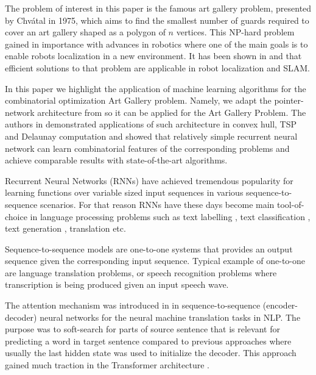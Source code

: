 \documentclass{article}
\begin{document}
The problem of interest in this paper is the famous art gallery problem, presented by Chv\'{a}tal in 1975, which aims to find the smallest number of guards required to cover an art gallery shaped as a polygon of $n$ vertices.  This NP-hard problem gained in importance with advances in robotics where one of the main goals  is to enable robots localization in a new environment. It has been shown in \cite{DBLP:journals/evi/BighamDK22} and \cite{1545170} that efficient solutions to that problem are applicable  in robot localization and SLAM.  


In this paper we highlight the application of machine learning algorithms for the combinatorial optimization Art Gallery problem. Namely, we adapt the pointer-network architecture from \cite{paper/vinyals2017pointer} so it can be applied for the Art Gallery Problem. The authors in \cite{paper/vinyals2017pointer} demonstrated applications of such architecture in convex hull, TSP and Delaunay computation and showed that relatively simple recurrent neural network can learn combinatorial features of the corresponding problems and achieve comparable results with state-of-the-art algorithms.


Recurrent Neural Networks (RNNs) have achieved tremendous popularity for learning functions over variable sized input sequences \cite{} in various sequence-to-sequence scenarios.   For that reason RNNs have these days become main tool-of-choice in language processing problems such as text labelling \cite{}, text classification \cite{}, text generation \cite{}, translation \cite{} etc. 

Sequence-to-sequence models are one-to-one systems that  provides an output sequence given the corresponding input sequence. Typical example of one-to-one are language translation problems, or speech recognition problems where transcription is being produced given an input speech wave. 

The attention mechanism was introduced in \cite{bahdanau2016neural} in sequence-to-sequence (encoder-decoder) neural networks for the neural machine translation tasks in NLP. The purpose was to soft-search  for parts of source sentence that is relevant for predicting a word in target sentence compared to previous approaches where usually the last hidden state was used to initialize the decoder. This approach gained much traction in the Transformer architecture \cite{vaswani2017attention}. 
\end{document}
